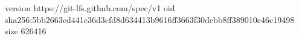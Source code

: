version https://git-lfs.github.com/spec/v1
oid sha256:5bb2663cd441c36d3cfd8d634413b9616ff3663f30dcbb8ff389010e46c19498
size 626416

